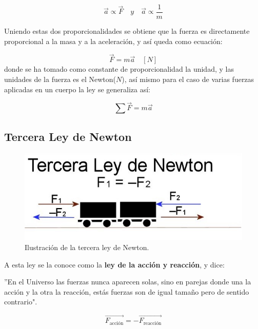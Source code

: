 \begin{equation}
\vec{a} \propto \vec{F} \quad y \quad \vec{a} \propto \frac{1}{m}
\end{equation}

Uniendo estas dos proporcionalidades se obtiene que la fuerza es directamente proporcional a la masa y a la aceleración, y así 
queda como ecuación:

\begin{equation}
\vec{F} = m\vec{a} \quad [N]
\end{equation}
donde se ha tomado como constante de proporcionalidad la unidad, y las unidades de la fuerza es el Newton($N$), así mismo para el 
caso de varias fuerzas aplicadas en un cuerpo la ley se generaliza así:

\begin{equation}
\sum \vec{F} = m\vec{a}
\end{equation} 

\subsection{Tercera Ley de Newton}

\begin{figure}[ht]
 \centering
 \includegraphics[scale=0.5]{images/tercera-ley-de-newton.jpg}
 \caption{Ilustración de la tercera ley de Newton.}\label{ac}
\end{figure}

A esta ley se la conoce como la \textbf{ley de la acción y reacción}, y dice:

\begin{tcolorbox}
''En el Universo las fuerzas nunca aparecen solas, sino en parejas donde una la acción y la otra la reacción, estás fuerzas son 
de igual tamaño pero de sentido contrario".
\end{tcolorbox}

\begin{equation}
\vec{F_{\text{acción}}} = -\vec{F_{\text{reacción}}}
\end{equation}

